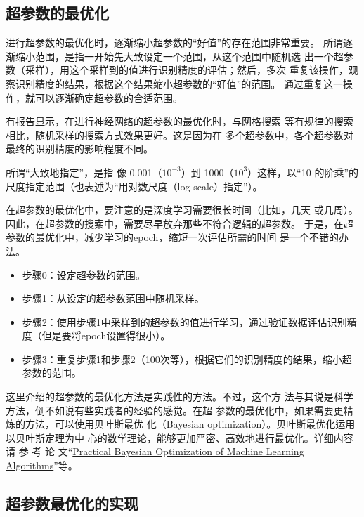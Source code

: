 \subsection{超参数的最优化}
进行超参数的最优化时，逐渐缩小超参数的“好值”的存在范围非常重要。
所谓逐渐缩小范围，是指一开始先大致设定一个范围，从这个范围中随机选
出一个超参数（采样），用这个采样到的值进行识别精度的评估；然后，多次
重复该操作，观察识别精度的结果，根据这个结果缩小超参数的“好值”的范围。
通过重复这一操作，就可以逐渐确定超参数的合适范围。
\begin{tcolorbox}
    有\href{https://www.jmlr.org/papers/volume13/bergstra12a/bergstra12a.pdf}{报告}显示，在进行神经网络的超参数的最优化时，与网格搜索
    等有规律的搜索相比，随机采样的搜索方式效果更好。这是因为在
    多个超参数中，各个超参数对最终的识别精度的影响程度不同。
\end{tcolorbox}

所谓“大致地指定”，是指
像 0.001（$10^{-3}$）到 1000（$10^3$）这样，以“10 的阶乘”的尺度指定范围（也表述为“用对数尺度（log scale）指定”）。

在超参数的最优化中，要注意的是深度学习需要很长时间（比如，几天
或几周）。因此，在超参数的搜索中，需要尽早放弃那些不符合逻辑的超参数。
于是，在超参数的最优化中，减少学习的epoch，缩短一次评估所需的时间
是一个不错的办法。
\begin{itemize}
    \item 步骤0：设定超参数的范围。
    \item 步骤1：从设定的超参数范围中随机采样。
    \item 步骤2：使用步骤1中采样到的超参数的值进行学习，通过验证数据评估识别精
          度（但是要将epoch设置得很小）。
    \item 步骤3：重复步骤1和步骤2（100次等），根据它们的识别精度的结果，缩小超参数的范围。
\end{itemize}

\begin{tcolorbox}
    这里介绍的超参数的最优化方法是实践性的方法。不过，这个方
    法与其说是科学方法，倒不如说有些实践者的经验的感觉。在超
    参数的最优化中，如果需要更精炼的方法，可以使用贝叶斯最优
    化（Bayesian optimization）。贝叶斯最优化运用以贝叶斯定理为中
    心的数学理论，能够更加严密、高效地进行最优化。详细内容请
    参 考 论 文“\href{https://arxiv.org/abs/1206.2944}{Practical Bayesian Optimization of Machine Learning Algorithms}”等。
\end{tcolorbox}
\subsection{超参数最优化的实现}

